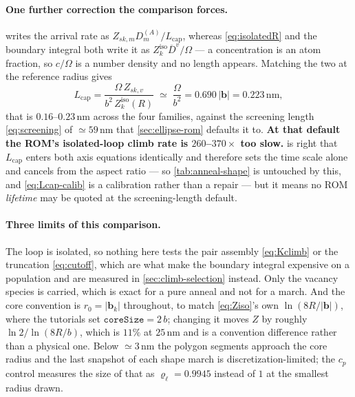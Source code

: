 \documentclass{article}
\newcommand{\bvec}{\bm b}
\newcommand{\code}[1]{\texttt{#1}}
\begin{document}
\paragraph{One further correction the comparison forces.}  writes
the arrival rate as $Z_{sk,m}D^{(A)}_m/L_{\mathrm{cap}}$, whereas
\cref{eq:isolatedR} and the boundary integral both write it as
$Z^{\mathrm{iso}}_k\overline D^{v}/\Omega$ --- a concentration is an atom fraction,
so $c/\Omega$ is a number density and no length appears. Matching the two at the
reference radius gives
\begin{equation}
  L_{\mathrm{cap}}
   =\frac{\Omega\,Z_{sk,v}}{b^{2}\,Z^{\mathrm{iso}}_k(R)}
   \;\simeq\;\frac{\Omega}{b^{2}}=0.690\,|\bvec|=0.223\,\mathrm{nm},
  \label{eq:Lcap-calib}
\end{equation}
that is $0.16$--$0.23\,$nm across the four families, against the screening length
\cref{eq:screening} of $\simeq59\,$nm that \cref{sec:ellipse-rom} defaults it to.
\textbf{At that default the ROM's isolated-loop climb rate is $260$--$370\times$
too slow.}  is right that $L_{\mathrm{cap}}$ enters both
axis equations identically and therefore sets the time scale alone and cancels
from the aspect ratio --- so \cref{tab:anneal-shape} is untouched by this, and
\cref{eq:Lcap-calib} is a calibration rather than a repair --- but it means no ROM
\emph{lifetime} may be quoted at the screening-length default.

\paragraph{Three limits of this comparison.} The loop is isolated, so nothing here
tests the pair assembly \cref{eq:Kclimb} or the truncation \cref{eq:cutoff}, which
are what make the boundary integral expensive on a population and are measured in
\cref{sec:climb-selection} instead. Only the vacancy species is carried, which is
exact for a pure anneal and not for a march. And the core convention is
$r_0=|\bvec_k|$ throughout, to match \cref{eq:Ziso}'s own $\ln(8R/|\bvec|)$,
where the tutorials set $\code{coreSize}=2\,b$; changing it moves $Z$ by roughly
$\ln2/\ln(8R/b)$, which is $11\%$ at $25\,$nm and is a convention difference
rather than a physical one. Below $\simeq3\,$nm the polygon segments approach the
core radius and the last snapshot of each shape march is discretization-limited;
the $c_p$ control measures the size of that as $\varrho_\ell=0.9945$ instead of
$1$ at the smallest radius drawn.
\end{document}
